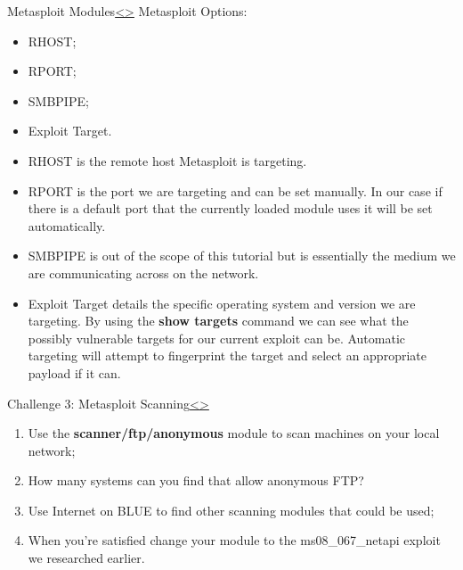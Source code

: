 \documentclass[12pt]{extarticle}
\newenvironment{instructionblock}{\Large\bgroup}{\egroup}
\begin{document}
\begin{slide}{Metasploit Modules\cite{b1}}{\hyperref[slide 13]{\textless}\hyperref[slide 15]{\textgreater}}
	\begin{instructionblock}
			Metasploit Options:
		\begin{itemize}			
			\item RHOST;
			\item RPORT;
			\item SMBPIPE;
			\item Exploit Target.
		\end{itemize}
	\end{instructionblock}
\end{slide}
\begin{itemize}
	\item RHOST is the remote host Metasploit is targeting.
	\item RPORT is the port we are targeting and can be set manually. In our case if there is a default port that the currently loaded module uses it will be set automatically.
	\item SMBPIPE is out of the scope of this tutorial but is essentially the medium we are communicating across on the network.
	\item Exploit Target details the specific operating system and version we are targeting. By using the \textbf{show targets} command we can see what the possibly vulnerable targets for our current exploit can be. Automatic targeting will attempt to fingerprint the target and select an appropriate payload if it can.
\end{itemize}

\pagebreak
\begin{slide}{Challenge 3: Metasploit Scanning}{\hyperref[slide 14]{\textless}\hyperref[slide 16]{\textgreater}}
\vskip 5pt
\begin{instructionblock}
	\begin{enumerate}
	\item Use the \textbf{scanner/ftp/anonymous} module to scan machines on your local network;
	\item How many systems can you find that allow anonymous FTP?
	\item Use Internet on BLUE to find other scanning modules that could be used;
	\item When you're satisfied change your module to the ms08\_067\_netapi exploit we researched earlier.
	\end{enumerate}
\end{instructionblock}
\end{slide}
\end{document}

